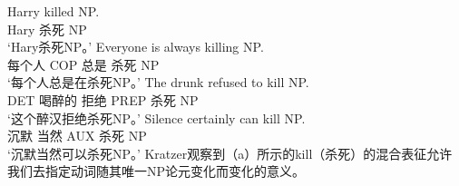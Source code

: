 \eal
\ex 
\gll Harry killed NP.\\
     Hary 杀死 NP\\
\glt `Hary杀死NP。'
\ex 
\gll Everyone is always killing NP.\\
     每个人 COP 总是 杀死 NP\\
\glt `每个人总是在杀死NP。'
\ex 
\gll The drunk refused to kill NP.\\
     DET 喝醉的 拒绝 PREP 杀死 NP\\
\glt `这个醉汉拒绝杀死NP。'
\ex 
\gll Silence certainly can kill NP.\\
     沉默 当然 AUX 杀死 NP\\
\glt `沉默当然可以杀死NP。'
\zl
Kratzer观察到（a）所示的kill（杀死）的混合表征允许我们去指定动词随其唯一NP论元变化而变化的意义。

